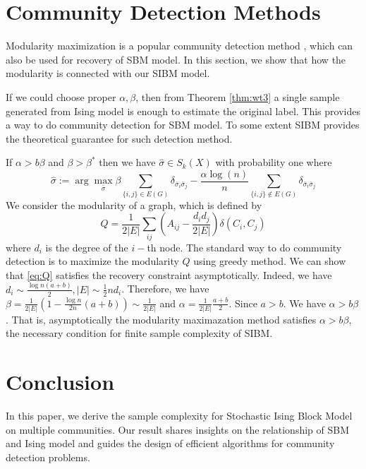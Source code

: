\documentclass[conference]{IEEEtran}
\newcommand{\ide}[2]{ \delta_{#1 #2} }
\begin{document}
\section{Community Detection Methods}\label{s:cdm}
Modularity maximization is a popular community detection method \cite{clauset2004finding}, which can also be used for recovery of SBM model.
In this section,
we show that how the modularity is connected with our SIBM model.

If we could choose proper $\alpha, \beta$, then from Theorem \ref{thm:wt3} a single sample generated from Ising model is enough to
estimate the original label. This provides a way to do community detection for SBM model.
To some extent
SIBM provides the theoretical guarantee for such detection method.

If $\alpha > b \beta$ and $\beta > \beta^*$ then we have $\hat{\sigma} \in S_k(X)$ with probability
one where
\begin{equation}\label{eq:hat_sigma}
\hat{\sigma} := \arg\max_{\bar{\sigma}}\beta \sum_{\{i,j\}\in E(G)} \ide{\bar{\sigma}_i}{\bar{\sigma}_j}
-\frac{\alpha\log(n)}{n} \sum_{\{i,j\}\notin E(G)} \ide{\bar{\sigma}_i}{\bar{\sigma}_j} 
\end{equation}
We consider the modularity of a graph, which is defined by
\begin{equation}\label{eq:Q}
	Q = \frac{1}{2 |E|} \sum_{ij} (A_{ij} - \frac{d_i d_j}{2 |E|}) \delta(C_i, C_j)
\end{equation}
where $d_i$ is the degree of the $i-$th node.
The standard way to do community detection is to maximize the modularity $Q$ using greedy method.
We can show that \eqref{eq:Q} satisfies the recovery constraint asymptotically.
Indeed, we have $d_i \sim \frac{\log n(a+b)}{2}, |E| \sim \frac{1}{2}n d_i$. Therefore, we have $\beta = \frac{1}{2|E|}(1-\frac{\log n}{2n}(a+b))
\sim \frac{1}{2|E|}$
and $\alpha = \frac{1}{2|E|}\frac{a+b}{2}$. Since $a>b$. We have $\alpha > b \beta$. That is, asymptotically the modularity maximazation method
satisfies $\alpha > b\beta$, the necessary condition for finite sample complexity of SIBM.

\section{Conclusion}\label{s:conclusion}
In this paper, we derive the sample complexity for Stochastic Ising Block Model on multiple communities.
Our result shares insights on the relationship of SBM and Ising model and guides the design of efficient algorithms
for community detection problems.
\end{document}
